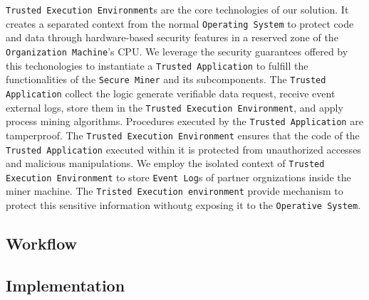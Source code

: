 \texttt{Trusted Execution Environment}s are the core technologies of our solution. It creates a separated context from the normal \texttt{Operating System} to protect code and data through hardware-based security features in a reserved zone of the \texttt{Organization Machine}'s CPU. We leverage the security guarantees offered by this techonologies to instantiate a \texttt{Trusted Application} to fulfill the functionalities of the \texttt{Secure Miner} and its subcomponents. The \texttt{Trusted Application} collect the logic generate verifiable data request, receive event external logs, store them in the \texttt{Trusted Execution Environment}, and apply process mining algorithms. Procedures executed by the \texttt{Trusted Application} are tamperproof. The \texttt{Trusted Execution Environment} ensures that the code of the \texttt{Trusted Application} executed within it is protected from unauthorized accesses and malicious manipulations. We employ the isolated context of \texttt{Trusted Execution Environment} to store \texttt{Event Log}s of partner orgnizations inside the miner machine. The \texttt{Tristed Execution environment} provide mechanism to protect this sensitive information withoutg exposing it to the \texttt{Operative System}. 
%



\subsection{Workflow}
\subsection{Implementation}
